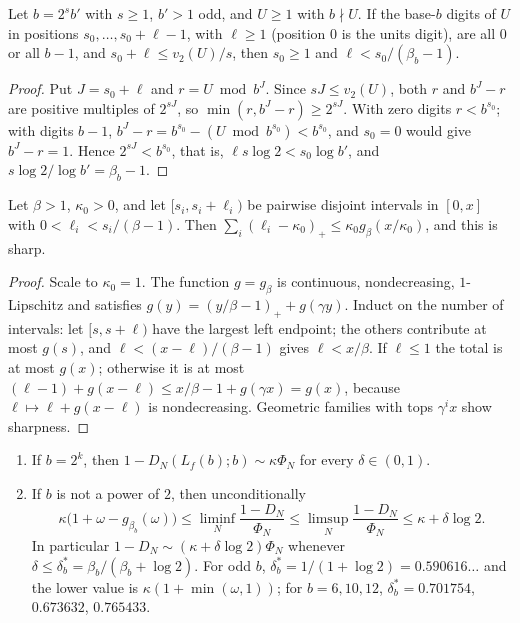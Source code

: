 \documentclass[11pt]{article}
\begin{document}
\begin{lemma}\label{lem:runbarrier}
Let $b=2^sb'$ with $s\ge1$, $b'>1$ odd, and $U\ge1$ with $b\nmid U$. If the base-$b$ digits of
$U$ in positions $s_0,\dots,s_0+\ell-1$, with $\ell\ge1$ (position $0$ is the units digit), are all $0$ or all
$b-1$, and $s_0+\ell\le v_2(U)/s$, then $s_0\ge1$ and $\ell<s_0/(\beta_b-1)$.
\end{lemma}

\begin{proof}
Put $J=s_0+\ell$ and $r=U\bmod b^J$. Since $sJ\le v_2(U)$, both $r$ and $b^J-r$ are positive
multiples of $2^{sJ}$, so $\min(r,b^J-r)\ge2^{sJ}$. With zero digits $r<b^{s_0}$; with digits
$b-1$, $b^J-r=b^{s_0}-(U\bmod b^{s_0})<b^{s_0}$, and $s_0=0$ would give $b^J-r=1$. Hence
$2^{sJ}<b^{s_0}$, that is, $\ell s\log2<s_0\log b'$, and $s\log2/\log b'=\beta_b-1$.
\end{proof}

\begin{lemma}[Packing]\label{lem:packing}
Let $\beta>1$, $\kappa_0>0$, and let $[s_i,s_i+\ell_i)$ be pairwise disjoint intervals in
$[0,x]$ with $0<\ell_i<s_i/(\beta-1)$. Then $\sum_i(\ell_i-\kappa_0)_+\le\kappa_0g_\beta(x/\kappa_0)$,
and this is sharp.
\end{lemma}

\begin{proof}
Scale to $\kappa_0=1$. The function $g=g_\beta$ is continuous, nondecreasing, $1$-Lipschitz
and satisfies $g(y)=(y/\beta-1)_++g(\gamma y)$. Induct on the number of intervals: let
$[s,s+\ell)$ have the largest left endpoint; the others contribute at most $g(s)$, and
$\ell<(x-\ell)/(\beta-1)$ gives $\ell<x/\beta$. If $\ell\le1$ the total is at most $g(x)$;
otherwise it is at most $(\ell-1)+g(x-\ell)\le x/\beta-1+g(\gamma x)=g(x)$, because
$\ell\mapsto\ell+g(x-\ell)$ is nondecreasing. Geometric families with tops $\gamma^ix$ show
sharpness.
\end{proof}

\begin{theorem}\label{thm:primedensity}
\leavevmode
\begin{enumerate}[label=\textup{(\alph*)},nosep]
\item If $b=2^k$, then $1-D_N(L_f(b);b)\sim\kappa\Phi_N$ for every $\delta\in(0,1)$.
\item If $b$ is not a power of $2$, then unconditionally
\[
\kappa\bigl(1+\omega-g_{\beta_b}(\omega)\bigr)\le\liminf_N\frac{1-D_N}{\Phi_N}\le\limsup_N\frac{1-D_N}{\Phi_N}\le\kappa+\delta\log2 .
\]
In particular $1-D_N\sim(\kappa+\delta\log2)\Phi_N$ whenever
$\delta\le\delta_b^*=\beta_b/(\beta_b+\log2)$. For odd $b$, $\delta_b^*=1/(1+\log2)=0.590616\ldots$
and the lower value is $\kappa(1+\min(\omega,1))$; for $b=6,10,12$, $\delta_b^*=0.701754$,
$0.673632$, $0.765433$.
\end{enumerate}
\end{theorem}
\end{document}
